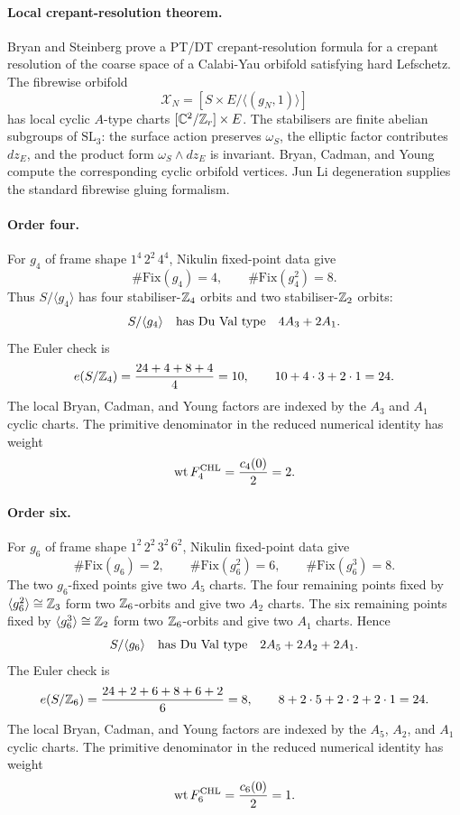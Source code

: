 \paragraph{Local crepant-resolution theorem.}
Bryan and Steinberg prove a PT/DT crepant-resolution formula for a
crepant resolution of the coarse space of a Calabi-Yau orbifold
satisfying hard Lefschetz. The fibrewise orbifold
\[
\mathcal X_N=[S\times E/\langle(g_N,1)\rangle]
\]
has local cyclic \(A\)-type charts \([\mathbb C^2/\mathbb{Z}_r]\times E\).
The stabilisers are finite abelian subgroups of \(\mathrm{SL}_3\): the
surface action preserves \(\omega_S\), the elliptic factor contributes
\(dz_E\), and the product form \(\omega_S\wedge dz_E\) is invariant.
Bryan, Cadman, and Young compute the corresponding cyclic orbifold
vertices. Jun Li degeneration supplies the standard fibrewise gluing
formalism.

\paragraph{Order four.}
For \(g_4\) of frame shape \(1^4\,2^2\,4^4\), Nikulin fixed-point data
give
\[
\#\mathrm{Fix}(g_4)=4,\qquad \#\mathrm{Fix}(g_4^2)=8.
\]
Thus \(S/\langle g_4\rangle\) has four stabiliser-\(\mathbb{Z}_4\) orbits and
two stabiliser-\(\mathbb{Z}_2\) orbits:
\[
S/\langle g_4\rangle\quad\hbox{has Du Val type}\quad 4A_3+2A_1 .
\]
The Euler check is
\[
e(S/\mathbb{Z}_4)=\frac{24+4+8+4}{4}=10,\qquad
10+4\cdot3+2\cdot1=24.
\]
The local Bryan, Cadman, and Young factors are indexed by the \(A_3\)
and \(A_1\) cyclic charts. The primitive denominator in the reduced
numerical identity has weight
\[
\mathrm{wt}\,F^{\mathrm{CHL}}_4=\frac{c_4(0)}{2}=2.
\]

\paragraph{Order six.}
For \(g_6\) of frame shape \(1^2\,2^2\,3^2\,6^2\), Nikulin fixed-point
data give
\[
\#\mathrm{Fix}(g_6)=2,\qquad
\#\mathrm{Fix}(g_6^2)=6,\qquad
\#\mathrm{Fix}(g_6^3)=8.
\]
The two \(g_6\)-fixed points give two \(A_5\) charts. The four
remaining points fixed by \(\langle g_6^2\rangle\cong\mathbb{Z}_3\) form two
\(\mathbb{Z}_6\)-orbits and give two \(A_2\) charts. The six remaining points
fixed by \(\langle g_6^3\rangle\cong\mathbb{Z}_2\) form two \(\mathbb{Z}_6\)-orbits
and give two \(A_1\) charts. Hence
\[
S/\langle g_6\rangle\quad\hbox{has Du Val type}\quad
2A_5+2A_2+2A_1 .
\]
The Euler check is
\[
e(S/\mathbb{Z}_6)=\frac{24+2+6+8+6+2}{6}=8,\qquad
8+2\cdot5+2\cdot2+2\cdot1=24.
\]
The local Bryan, Cadman, and Young factors are indexed by the \(A_5\),
\(A_2\), and \(A_1\) cyclic charts. The primitive denominator in the
reduced numerical identity has weight
\[
\mathrm{wt}\,F^{\mathrm{CHL}}_6=\frac{c_6(0)}{2}=1.
\]

